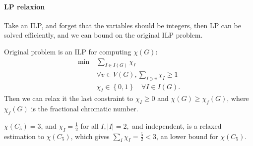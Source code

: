 \paragraph{LP relaxion}
Take an ILP, and forget that the variables should be integers, then LP can be solved efficiently, and we can bound on the original ILP problem.

\begin{eg}
    Original problem is an ILP for computing \(\chi (G)\): 
    \[
        \begin{aligned}
            \min~ & \sum_{I \in I(G)} \chi _I   \\
                & \forall v \in V(G), \sum_{I \ni v} \chi _I \ge 1   \\
                & \chi _I \in \left\{ 0, 1 \right\} \quad \forall I \in I(G). 
        \end{aligned}
    \]
    Then we can relax it the last constraint to \(\chi _I \ge 0\) and \(\chi (G) \ge \chi _f (G)\), where \(\chi _f(G)\) is the fractional chromatic number.   
\end{eg}

\begin{eg}
    \(\chi (C_5) = 3\), and \(\chi _I = \frac{1}{2}\) for all \(I, \vert I \vert = 2, \) and independent, is a relaxed estimation to \(\chi (C_5)\), which gives \(\sum_{I} \chi _I = \frac{5}{2} < 3 \), an lower bound for \(\chi (C_5)\).    
\end{eg}